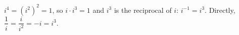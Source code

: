 $i^4=\left(i^2\right)^2=1$, so $i\cdot i^3=1$ and $i^3$ is the reciprocal of $i$: $i^{-1}=i^3$. Directly, $\dfrac{1}{i}=\dfrac{i}{i^2}=-i=i^3$.
